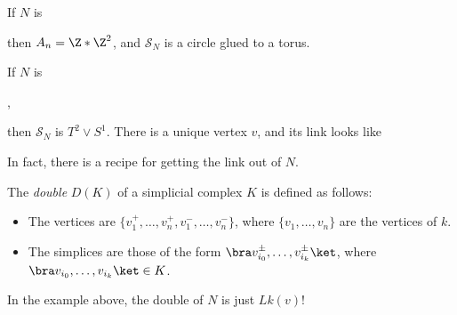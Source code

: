 \documentclass[a4paper]{article}
\begin{document}
\begin{eg}
  If $N$ is
  \begin{center}
  \end{center}
  then $A_n = \Z * \Z^2$, and $\mathcal{S}_N$ is a circle glued to a torus.
\end{eg}

\begin{eg}
  If $N$ is
  \begin{center}
    ,
  \end{center}
  then $\mathcal{S}_N$ is $T^2 \vee S^1$. There is a unique vertex $v$, and its link looks like
  \begin{center}
  \end{center}
\end{eg}
In fact, there is a recipe for getting the link out of $N$.

\begin{defi}[Double]
  The \emph{double} $D(K)$ of a simplicial complex $K$ is defined as follows:
  \begin{itemize}
    \item The vertices are $\{v_1^+, \ldots, v_n^+, v_1^-, \ldots, v_n^-\}$, where $\{v_1, \ldots, v_n\}$ are the vertices of $k$.
    \item The simplices are those of the form $\bra v_{i_0}^{\pm}, \ldots, v_{i_k}^{\pm}\ket$, where $\bra v_{i_0}, \ldots, v_{i_k}\ket \in K$.
  \end{itemize}
\end{defi}

\begin{eg}
  In the example above, the double of $N$ is just $Lk(v)$!
\end{eg}
\end{document}
